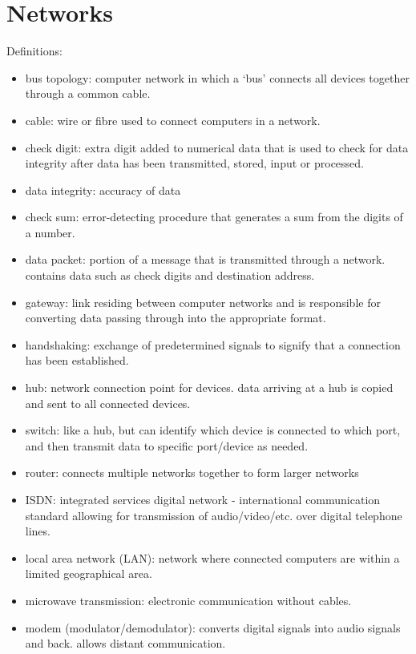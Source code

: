 \documentclass{article}
\begin{document}
\section{Networks}
Definitions:
\begin{itemize}
    \item bus topology: computer network in which a `bus' connects all devices
        together through a common cable.
    \item cable: wire or fibre used to connect computers in a network.
    \item check digit: extra digit added to numerical data that is used to
        check for data integrity after data has been transmitted, stored, input
        or processed.
    \item data integrity: accuracy of data
    \item check sum: error-detecting procedure that generates a sum from the
        digits of a number.
    \item data packet: portion of a message that is transmitted through a
        network. contains data such as check digits and destination address.
    \item gateway: link residing between computer networks and is responsible
        for converting data passing through into the appropriate format.
    \item handshaking: exchange of predetermined signals to signify that a
        connection has been established.
    \item hub: network connection point for devices. data arriving at a hub is
        copied and sent to all connected devices.
    \item switch: like a hub, but can identify which device is connected to
        which port, and then transmit data to specific port/device as needed.
    \item router: connects multiple networks together to form larger networks
    \item ISDN: integrated services digital network - international
        communication standard allowing for transmission of audio/video/etc.
        over digital telephone lines.
    \item local area network (LAN): network where connected computers are
        within a limited geographical area.
    \item microwave transmission: electronic communication without cables.
    \item modem (modulator/demodulator): converts digital signals into audio
        signals and back. allows distant communication.

\end{itemize}
\end{document}
